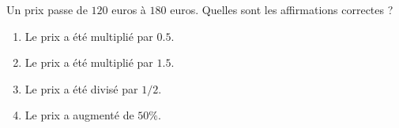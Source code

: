
\begin{exercice}\label{exoPremiere-0010}

    Un prix passe de \( 120\) euros à \( 180\) euros. Quelles sont les affirmations correctes ?
    \begin{enumerate}
        \item
            Le prix a été multiplié par \( 0.5\).
        \item
            Le prix a été multiplié par \( 1.5\).
        \item
            Le prix a été divisé par \( 1/2\).
        \item
            Le prix a augmenté de \( 50\%\).
    \end{enumerate}

\end{exercice}
